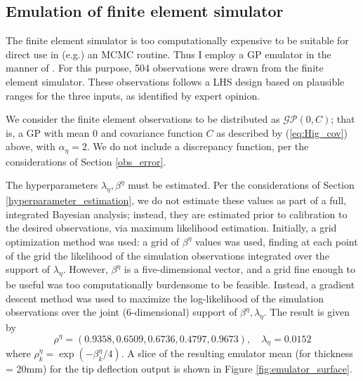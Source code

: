 \documentclass{article}
\begin{document}
\subsection{Emulation of finite element simulator}\label{emulator}
The finite element simulator is too computationally expensive to be suitable for direct use in (e.g.) an MCMC routine. Thus I employ a GP emulator in the manner of \cite{Williams2006}. For this purpose, 504 observations were drawn from the finite element simulator. These observations follows a LHS design based on plausible ranges for the three inputs, as identified by expert opinion.

We consider the finite element observations to be distributed as $\mathcal{GP}(0,C)$; that is, a GP with mean 0 and covariance function $C$ as described by (\ref{eq:Hig_cov}) above, with $\alpha_\eta=2$. We do not include a discrepancy function, per the considerations of Section \ref{obs_error}.

The hyperparameters $\lambda_\eta,\beta^\eta$ must be estimated. Per the considerations of Section \ref{hyperparameter_estimation}, we do not estimate these values as part of a full, integrated Bayesian analysis; instead, they are estimated prior to calibration to the desired observations, via maximum likelihood estimation. Initially, a grid optimization method was used: a grid of $\beta^\eta$ values was used, finding at each point of the grid the likelihood of the simulation observations integrated over the support of $\lambda_\eta$. However, $\beta^\eta$ is a five-dimensional vector, and a grid fine enough to be useful was too computationally burdensome to be feasible. Instead, a gradient descent method was used to maximize the log-likelihood of the simulation observations over the joint (6-dimensional) support of $\beta^\eta,\lambda_\eta$.  The result is given by
\begin{equation}\label{eq:MLEs}
\rho^\eta = (0.9358, 0.6509, 0.6736, 0.4797, 0.9673),\quad
\lambda_\eta = 0.0152
\end{equation}
where $\rho^\eta_k = \exp(-\beta_k^\eta/4)$. A slice of the resulting emulator mean (for thickness = 20mm) for the tip deflection output is shown in Figure \ref{fig:emulator_surface}.
\end{document}
